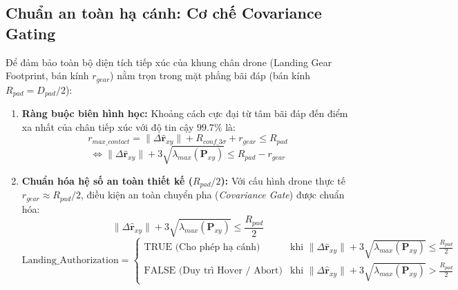 \documentclass[12pt,a4paper]{article}
\begin{document}
\subsection{Chuẩn an toàn hạ cánh: Cơ chế Covariance Gating}
Để đảm bảo toàn bộ diện tích tiếp xúc của khung chân drone (Landing Gear Footprint, bán kính $r_{gear}$) nằm trọn trong mặt phẳng bãi đáp (bán kính $R_{pad} = D_{pad}/2$):
\begin{enumerate}
    \item \textbf{Ràng buộc biên hình học:} Khoảng cách cực đại từ tâm bãi đáp đến điểm xa nhất của chân tiếp xúc với độ tin cậy $99.7\%$ là:
    \begin{equation}
        r_{max\_contact} = \|\Delta \hat{\mathbf{r}}_{xy}\| + R_{conf\_3\sigma} + r_{gear} \le R_{pad}
    \end{equation}
    \begin{equation}
        \iff \|\Delta \hat{\mathbf{r}}_{xy}\| + 3\sqrt{\lambda_{max}(\mathbf{P}_{xy})} \le R_{pad} - r_{gear}
    \end{equation}
    \item \textbf{Chuẩn hóa hệ số an toàn thiết kế ($R_{pad}/2$):} Với cấu hình drone thực tế $r_{gear} \approx R_{pad}/2$, điều kiện an toàn chuyển pha (\textit{Covariance Gate}) được chuẩn hóa:
    \begin{equation}
        \boxed{\|\Delta \hat{\mathbf{r}}_{xy}\| + 3\sqrt{\lambda_{max}(\mathbf{P}_{xy})} \le \frac{R_{pad}}{2}}
    \end{equation}
    \begin{equation}
        \text{Landing\_Authorization} = \begin{cases}
            \text{TRUE (Cho phép hạ cánh)} & \text{khi } \|\Delta \hat{\mathbf{r}}_{xy}\| + 3\sqrt{\lambda_{max}(\mathbf{P}_{xy})} \le \frac{R_{pad}}{2} \\
            \text{FALSE (Duy trì Hover / Abort)} & \text{khi } \|\Delta \hat{\mathbf{r}}_{xy}\| + 3\sqrt{\lambda_{max}(\mathbf{P}_{xy})} > \frac{R_{pad}}{2}
        \end{cases}
    \end{equation}
\end{enumerate}
\end{document}
